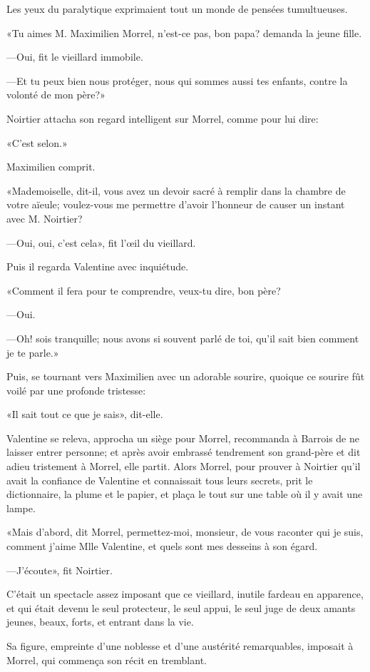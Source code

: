 Les yeux du paralytique exprimaient tout un monde de pensées tumultueuses. 

«Tu aimes M. Maximilien Morrel, n'est-ce pas, bon papa? demanda la jeune fille. 

—Oui, fit le vieillard immobile. 

—Et tu peux bien nous protéger, nous qui sommes aussi tes enfants, contre la volonté de mon père?» 

Noirtier attacha son regard intelligent sur Morrel, comme pour lui dire: 

«C'est selon.» 

Maximilien comprit. 

«Mademoiselle, dit-il, vous avez un devoir sacré à remplir dans la chambre de votre aïeule; voulez-vous me permettre d'avoir l'honneur de causer un instant avec M. Noirtier? 

—Oui, oui, c'est cela», fit l'œil du vieillard. 

Puis il regarda Valentine avec inquiétude. 

«Comment il fera pour te comprendre, veux-tu dire, bon père? 

—Oui. 

—Oh! sois tranquille; nous avons si souvent parlé de toi, qu'il sait bien comment je te parle.»  

Puis, se tournant vers Maximilien avec un adorable sourire, quoique ce sourire fût voilé par une profonde tristesse: 

«Il sait tout ce que je sais», dit-elle. 

Valentine se releva, approcha un siège pour Morrel, recommanda à Barrois de ne laisser entrer personne; et après avoir embrassé tendrement son grand-père et dit adieu tristement à Morrel, elle partit. Alors Morrel, pour prouver à Noirtier qu'il avait la confiance de Valentine et connaissait tous leurs secrets, prit le dictionnaire, la plume et le papier, et plaça le tout sur une table où il y avait une lampe. 

«Mais d'abord, dit Morrel, permettez-moi, monsieur, de vous raconter qui je suis, comment j'aime Mlle Valentine, et quels sont mes desseins à son égard. 

—J'écoute», fit Noirtier. 

C'était un spectacle assez imposant que ce vieillard, inutile fardeau en apparence, et qui était devenu le seul protecteur, le seul appui, le seul juge de deux amants jeunes, beaux, forts, et entrant dans la vie. 

Sa figure, empreinte d'une noblesse et d'une austérité remarquables, imposait à Morrel, qui commença son récit en tremblant. 

